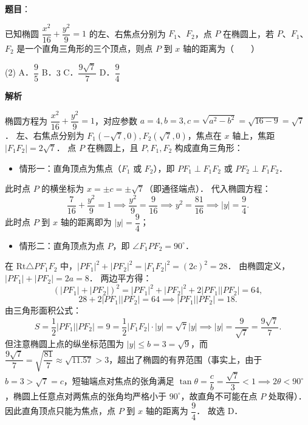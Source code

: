 \begin{answer}

\textbf{题目}：

已知椭圆 $\dfrac{x^2}{16} + \dfrac{y^2}{9} = 1$ 的左、右焦点分别为 $F_1$、$F_2$，点 $P$ 在椭圆上，若 $P$、$F_1$、$F_2$ 是一个直角三角形的三个顶点，则点 $P$ 到 $x$ 轴的距离为\mbox{（　　）}

\begin{gkopts}(2)
\task A．$\dfrac{9}{5}$
\task B．$3$
\task C．$\dfrac{9\sqrt{7}}{7}$
\task D．$\dfrac{9}{4}$
\end{gkopts}

\textbf{解析}

椭圆方程为 $\dfrac{x^2}{16} + \dfrac{y^2}{9} = 1$，对应参数 $a = 4, b = 3, c = \sqrt{a^2 - b^2} = \sqrt{16 - 9} = \sqrt{7}$．
左、右焦点分别为 $F_1(-\sqrt{7}, 0), F_2(\sqrt{7}, 0)$，焦点在 $x$ 轴上，焦距 $|F_1F_2| = 2\sqrt{7}$．
点 $P$ 在椭圆上，且 $P, F_1, F_2$ 构成直角三角形：
\begin{itemize}
\item 情形一：直角顶点为焦点（$F_1$ 或 $F_2$），即 $PF_1 \perp F_1F_2$ 或 $PF_2 \perp F_1F_2$．
\end{itemize}
  此时点 $P$ 的横坐标为 $x = \pm c = \pm \sqrt{7}$（即通径端点）．
  代入椭圆方程：
\nopagebreak[4]
\[
\frac{7}{16} + \frac{y^2}{9} = 1 \implies \frac{y^2}{9} = \frac{9}{16} \implies y^2 = \frac{81}{16} \implies |y| = \frac{9}{4}.
\]
  此时点 $P$ 到 $x$ 轴的距离即为 $|y| = \dfrac{9}{4}$；
\begin{itemize}
\item 情形二：直角顶点为点 $P$，即 $\angle F_1PF_2 = 90^\circ$．
\end{itemize}
  在 $\mathrm{Rt}\triangle PF_1F_2$ 中，$|PF_1|^2 + |PF_2|^2 = |F_1F_2|^2 = (2c)^2 = 28$．
  由椭圆定义，$|PF_1| + |PF_2| = 2a = 8$．
  两边平方得：
\nopagebreak[4]
\[
(|PF_1| + |PF_2|)^2 = |PF_1|^2 + |PF_2|^2 + 2|PF_1||PF_2| = 64,
\]
\nopagebreak[4]
\[
28 + 2|PF_1||PF_2| = 64 \implies |PF_1||PF_2| = 18.
\]
  由三角形面积公式：
\nopagebreak[4]
\[
S = \frac{1}{2}|PF_1||PF_2| = 9 = \frac{1}{2}|F_1F_2| \cdot |y| = \sqrt{7}|y| \implies |y| = \frac{9}{\sqrt{7}} = \frac{9\sqrt{7}}{7}.
\]
  但注意椭圆上点的纵坐标范围为 $|y| \leqslant b = 3 = \sqrt{9}$，而 $\dfrac{9\sqrt{7}}{7} = \sqrt{\dfrac{81}{7}} \approx \sqrt{11.57} > 3$，超出了椭圆的有界范围（事实上，由于 $b = 3 > \sqrt{7} = c$，短轴端点对焦点的张角满足 $\tan\theta = \dfrac{c}{b} = \dfrac{\sqrt{7}}{3} < 1 \implies 2\theta < 90^\circ$，椭圆上任意点对两焦点的张角均严格小于 $90^\circ$，故直角不可能在点 $P$ 处取得）．
因此直角顶点只能为焦点，点 $P$ 到 $x$ 轴的距离为 $\dfrac{9}{4}$．
故选 D．


\end{answer}
